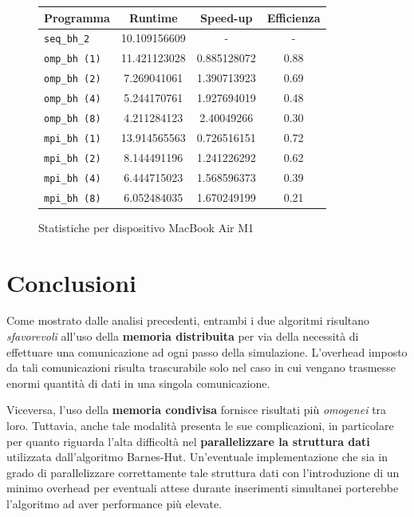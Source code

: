 \documentclass[12pt]{report}
\begin{document}
    \begin{figure}[H]
        \centering

        \begin{tabular}{ l | c | c | c }
            \textbf{Programma} & \textbf{Runtime} & \textbf{Speed-up} & \textbf{Efficienza}\\
            \hline
            \texttt{seq\_bh\_2} & 10.109156609 & - & - \\
            \hline
            \texttt{omp\_bh (1)} & 11.421123028 & 0.885128072 & 0.88 \\
            \texttt{omp\_bh (2)} & 7.269041061 & 1.390713923 & 0.69 \\
            \texttt{omp\_bh (4)} & 5.244170761 & 1.927694019 & 0.48 \\
            \texttt{omp\_bh (8)} & 4.211284123 & 2.40049266 & 0.30 \\
            \hline
            \texttt{mpi\_bh (1)} & 13.914565563 & 0.726516151 & 0.72 \\
            \texttt{mpi\_bh (2)} & 8.144491196 & 1.241226292 & 0.62 \\
            \texttt{mpi\_bh (4)} & 6.444715023 & 1.568596373 & 0.39 \\
            \texttt{mpi\_bh (8)} & 6.052484035 & 1.670249199 & 0.21 \\
        \end{tabular}
        \caption{Statistiche per dispositivo MacBook Air M1}
        \label{fig:stats_m1_2}
    \end{figure}

    \newpage

    \chapter{Conclusioni}

    Come mostrato dalle analisi precedenti, entrambi i due algoritmi risultano \textit{sfavorevoli} all'uso della \textbf{memoria distribuita} per via della necessità di effettuare una comunicazione ad ogni passo della simulazione. L'overhead imposto da tali comunicazioni risulta trascurabile solo nel caso in cui vengano trasmesse enormi quantità di dati in una singola comunicazione.

    Viceversa, l'uso della \textbf{memoria condivisa} fornisce risultati più \textit{omogenei} tra loro. Tuttavia, anche tale modalità presenta le sue complicazioni, in particolare per quanto riguarda l'alta difficoltà nel \textbf{parallelizzare la struttura dati} utilizzata dall'algoritmo Barnes-Hut. Un'eventuale implementazione che sia in grado di parallelizzare correttamente tale struttura dati con l'introduzione di un minimo overhead per eventuali attese durante inserimenti simultanei porterebbe l'algoritmo ad aver performance più elevate.
\end{document}
